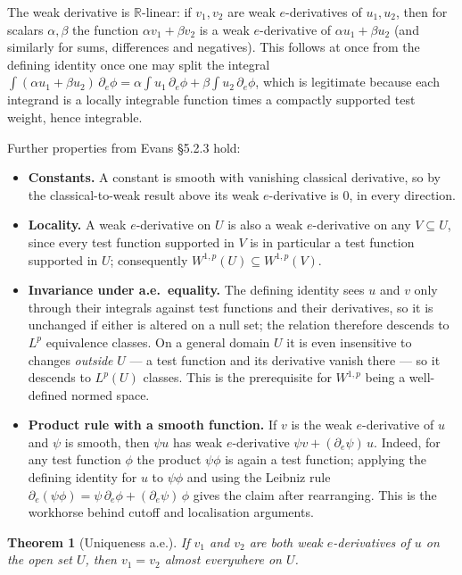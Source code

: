 ﻿\documentclass[12pt, a4paper]{article}
\renewcommand{\_}{\origunderscore\allowbreak}
\theoremstyle{definition}
\theoremstyle{plain}
\newtheorem{theorem}{Theorem}[section]
\begin{document}
The weak derivative is $\mathbb{R}$-linear: if $v_1,v_2$ are weak $e$-derivatives of
$u_1,u_2$, then for scalars $\alpha,\beta$ the function $\alpha v_1+\beta v_2$ is a weak
$e$-derivative of $\alpha u_1+\beta u_2$ (and similarly for sums, differences and
negatives). This follows at once from the defining identity once one may split the
integral $\int(\alpha u_1+\beta u_2)\,\partial_e\phi=\alpha\int u_1\,\partial_e\phi+\beta
\int u_2\,\partial_e\phi$, which is legitimate because each integrand is a locally
integrable function times a compactly supported test weight, hence integrable.

Further properties from Evans §5.2.3 hold:

\begin{itemize}
  \item \textbf{Constants.} A constant is smooth with vanishing classical derivative, so by
    the classical-to-weak result above its weak $e$-derivative is $0$, in every direction.
  \item \textbf{Locality.} A weak $e$-derivative on $U$ is also a weak $e$-derivative on any
    $V\subseteq U$, since every test function supported in $V$ is in particular a test
    function supported in $U$; consequently $W^{1,p}(U)\subseteq W^{1,p}(V)$.
  \item \textbf{Invariance under a.e.\ equality.} The defining identity sees $u$ and $v$
    only through their integrals against test functions and their derivatives, so it is
    unchanged if either is altered on a null set; the relation therefore descends to $L^p$
    equivalence classes. On a general domain $U$ it is even insensitive to changes
    \emph{outside} $U$ --- a test function and its derivative vanish there --- so it descends
    to $L^p(U)$ classes. This is the prerequisite for $W^{1,p}$ being a well-defined normed
    space.
  \item \textbf{Product rule with a smooth function.} If $v$ is the weak $e$-derivative of
    $u$ and $\psi$ is smooth, then $\psi u$ has weak $e$-derivative
    $\psi v+(\partial_e\psi)\,u$. Indeed, for any test function $\phi$ the product
    $\psi\phi$ is again a test function; applying the defining identity for $u$ to $\psi\phi$
    and using the Leibniz rule
    $\partial_e(\psi\phi)=\psi\,\partial_e\phi+(\partial_e\psi)\,\phi$ gives the claim after
    rearranging. This is the workhorse behind cutoff and localisation arguments.
\end{itemize}

\begin{theorem}[Uniqueness a.e.]
If $v_1$ and $v_2$ are both weak $e$-derivatives of $u$ on the open set $U$, then
$v_1 = v_2$ almost everywhere on $U$.
\end{theorem}
\end{document}

